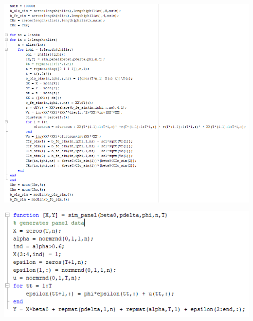 \documentclass[11pt]{article} %
\begin{document}
\includegraphics{hw6p2}

\includegraphics{hw6p3}
\end{document}
